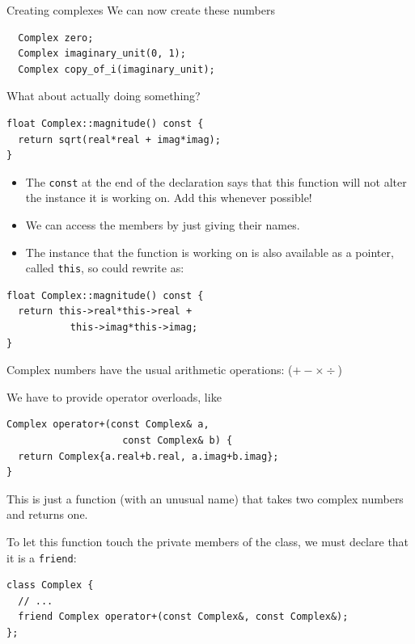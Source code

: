 \documentclass[presentation,t]{beamer}
\newcommand{\code}[1]{\lstinline!#1!}
\begin{document}
\begin{frame}[fragile]{Creating complexes}
We can now create these numbers
\begin{lstlisting}
  Complex zero;
  Complex imaginary_unit(0, 1);
  Complex copy_of_i(imaginary_unit);
\end{lstlisting}
What about actually doing something?
\end{frame}

\begin{frame}[fragile]{}
\begin{lstlisting}
float Complex::magnitude() const {
  return sqrt(real*real + imag*imag);
}
\end{lstlisting}
  \begin{itemize}
  \item The \code{const} at the end of the declaration says that this
    function will not alter the instance it is working on. Add this
    whenever possible!

  \item We can access the members by just giving their names.

  \item The instance that the function is working on is also available
    as a pointer, called \code{this}, so could rewrite as:
  \end{itemize}
\begin{lstlisting}
float Complex::magnitude() const {
  return this->real*this->real +
           this->imag*this->imag;
}
\end{lstlisting}
\end{frame}

\begin{frame}[fragile]{}
  Complex numbers have the usual arithmetic operations: ($+-\times\div$)%
  
  We have to provide operator overloads, like
\begin{lstlisting}
Complex operator+(const Complex& a,
                    const Complex& b) {
  return Complex{a.real+b.real, a.imag+b.imag};
}
\end{lstlisting}
  This is just a function (with an unusual name) that takes two
  complex numbers and returns one.

  To let this function touch the private members of the class, we must
  declare that it is a \code{friend}:
\begin{lstlisting}
class Complex {
  // ...
  friend Complex operator+(const Complex&, const Complex&);
};
\end{lstlisting}
\end{frame}
\end{document}
